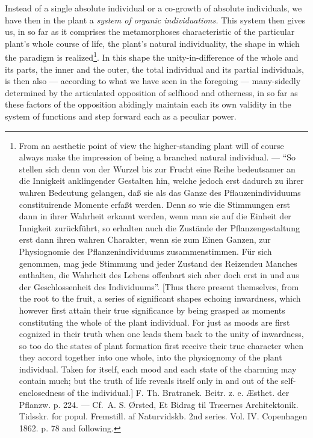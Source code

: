 \documentclass[12pt,a4paper]{book}
\begin{document}
\setcounter{footnote}{0}
Instead of a single absolute individual or a co-growth of absolute individuals, we
have then in the plant a \emph{system of organic individuations.} This system then
gives us, in so far as it comprises the metamorphoses characteristic of the
particular plant's whole course of life, the plant's natural individuality, the
shape in which the paradigm is realized\footnote{From an aesthetic point of view
the higher-standing plant will of course always make the impression of being a
branched natural individual. --- ``So stellen sich denn von der Wurzel bis zur
Frucht eine Reihe bedeutsamer an die Innigkeit anklingender Gestalten hin, welche
jedoch erst dadurch zu ihrer wahren Bedeutung gelangen, daß sie als das Ganze des
Pflauzenindividuums constituirende Momente erfaßt werden. Denn so wie die
Stimmungen erst dann in ihrer Wahrheit erkannt werden, wenn man sie auf die
Einheit der Innigkeit zurückführt, so erhalten auch die Zustände der
Pflanzengestaltung erst dann ihren wahren Charakter, wenn sie zum Einen Ganzen,
zur Physiognomie des Pflanzenindividuums zusammenstimmen. Für sich genommen, mag
jede Stimmung und jeder Zustand des Reizendeu Manches enthalten, die Wahrheit des
Lebens offenbart sich aber doch erst in und aus der Geschlossenheit des
Individuums''. [Thus there present themselves, from the root to the fruit, a series
of significant shapes echoing inwardness, which however first attain their true
significance by being grasped as moments constituting the whole of the plant
individual. For just as moods are first cognized in their truth when one leads them
back to the unity of inwardness, so too do the states of plant formation first
receive their true character when they accord together into one whole, into the
physiognomy of the plant individual. Taken for itself, each mood and each state of
the charming may contain much; but the truth of life reveals itself only in and out
of the self-enclosedness of the individual.]
F. Th. Bratranek. Beitr. z. e. Æsthet. der Pflanzw. p. 224. --- Cf.\
A. S. Ørsted, Et Bidrag til Træernes Architektonik. Tidsskr. for popul. Fremstill.
af Naturvidskb. 2nd series. Vol. IV. Copenhagen 1862. p. 78 and following.}. In
this shape the unity-in-difference of the whole and its parts, the inner and the
outer, the total individual and its partial individuals, is then also --- according
to what we have seen in the foregoing --- many-sidedly determined by the articulated
opposition of selfhood and otherness, in so far as these factors of the opposition
abidingly maintain each its own validity in the system of functions and step forward
each as a peculiar power.
\end{document}
